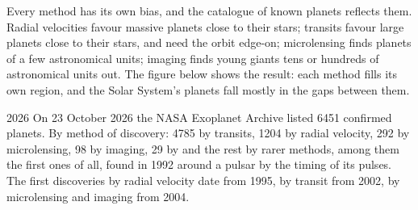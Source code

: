 Every method has its own bias, and the catalogue of known planets
reflects them. Radial velocities favour massive planets close to their
stars; transits favour large planets close to their stars, and need the
orbit edge-on; microlensing finds planets of a few astronomical units;
imaging finds young giants tens or hundreds of astronomical units out.
The figure below shows the result: each method fills its own region, and
the Solar System's planets fall mostly in the gaps between them.

\begin{dated}{2026}
On 23 October 2026 the NASA Exoplanet Archive listed 6451 confirmed
planets. By method of discovery: 4785 by transits, 1204 by radial
velocity, 292 by microlensing, 98 by imaging, 29 by  and the rest by rarer methods, among them the first ones of
all, found in 1992 around a pulsar by the timing of its pulses. The first
discoveries by radial velocity date from 1995, by transit from 2002, by
microlensing and imaging from 2004.
\end{dated}

